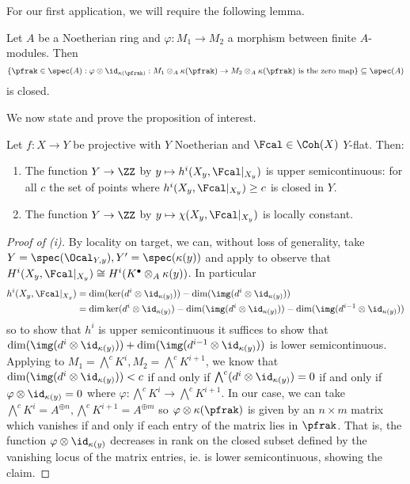 For our first application, we will require the following lemma. 
\begin{lemma}\label{lem: tensor residue field is closed}
    Let $A$ be a Noetherian ring and $\varphi:M_{1}\to M_{2}$ a morphism between finite $A$-modules. Then 
    $$\{\pfrak\in\spec(A):\varphi\otimes\id_{\kappa(\pfrak)}:M_{1}\otimes_{A}\kappa(\pfrak)\to M_{2}\otimes_{A}\kappa(\pfrak)\text{ is the zero map}\}\subseteq\spec(A)$$
    is closed. 
\end{lemma}
We now state and prove the proposition of interest. 
\begin{proposition}\label{prop: upper semicontinuity of local cohomology}
    Let $f:X\to Y$ be projective with $Y$ Noetherian and $\Fcal\in\Coh(X)$ $Y$-flat. Then:
    \begin{enumerate}[label=(\roman*)]
        \item The function $Y\to\ZZ$ by $y\mapsto h^{i}(X_{y},\Fcal|_{X_{y}})$ is upper semicontinuous: for all $c$ the set of points where $h^{i}(X_{y},\Fcal|_{X_{y}})\geq c$ is closed in $Y$. 
        \item The function $Y\to \ZZ$ by $y\mapsto \chi(X_{y},\Fcal|_{X_{y}})$ is locally constant. 
    \end{enumerate}
\end{proposition}
\begin{proof}[Proof of (i)]
    By locality on target, we can, without loss of generality, take $Y=\spec(\Ocal_{Y,y}),Y'=\spec(\kappa(y))$ and apply  to observe that $H^{i}(X_{y},\Fcal|_{X_{y}})\cong H^{i}(K^{\bullet}\otimes_{A}\kappa(y))$. In particular 
    \begin{align*}
        h^{i}(X_{y},\Fcal|_{X_{y}})&=\dim(\ker(d^{i}\otimes\id_{\kappa(y)})) - \dim(\img(d^{i}\otimes\id_{\kappa(y)})) \\
        &= \dim\ker(d^{i}\otimes\id_{\kappa(y)})-\dim(\img(d^{i}\otimes\id_{\kappa(y)})) - \dim(\img(d^{i-1}\otimes\id_{\kappa(y)}))
    \end{align*}
    so to show that $h^{i}$ is upper semicontinuous it suffices to show that $\dim(\img(d^{i}\otimes\id_{\kappa(y)})) + \dim(\img(d^{i-1}\otimes\id_{\kappa(y)}))$ is lower semicontinuous. Applying  to $M_{1}=\bigwedge^{c}K^{i},M_{2}=\bigwedge^{c}K^{i+1}$, we know that $\dim(\img(d^{i}\otimes\id_{\kappa(y)}))<c$ if and only if $\bigwedge^{c}(d^{i}\otimes\id_{\kappa(y)})=0$ if and only if $\varphi\otimes\id_{\kappa(y)}=0$ where $\varphi:\bigwedge^{c}K^{i}\to\bigwedge^{c}K^{i+1}$. In our case, we can take $\bigwedge^{c}K^{i}=A^{\oplus n},\bigwedge^{c}K^{i+1}=A^{\oplus m}$ so $\varphi\otimes\kappa(\pfrak)$ is given by an $n\times m$ matrix which vanishes if and only if each entry of the matrix lies in $\pfrak$. That is, the function $\varphi\otimes\id_{\kappa(y)}$ decreases in rank on the closed subset defined by the vanishing locus of the matrix entries, ie. is lower semicontinuous, showing the claim. 
\end{proof}
